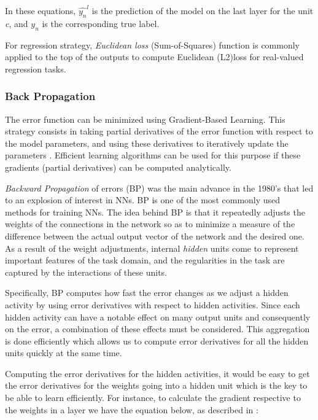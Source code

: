 In these equations, $\hat{y_n}^{l}$ is the prediction of the model on the last layer for the unit \textit{c}, and $y_n$  is the corresponding true label.

For regression strategy, \textit{Euclidean loss} (Sum-of-Squares) function is commonly applied to the top of the outputs to compute Euclidean (L2)loss for real-valued regression tasks.
 


\subsubsection{Back Propagation}
\label{subsec:bp}

The error function can be minimized using Gradient-Based Learning. This strategy consists in taking partial derivatives of the error function with respect to the model parameters, and using these derivatives to iteratively update the parameters \cite{lecun1998gradient}. Efficient learning algorithms can be used for this purpose if these gradients (partial derivatives) can be computed analytically.

\textit{Backward Propagation} of errors (BP) was the main advance in the 1980's that led to an explosion of interest in NNs. BP is one of the most commonly used methods for training NNs. The idea behind BP is that it repeatedly adjusts the weights of the connections in the network so as to minimize a measure of the difference between the actual output vector of the network and the desired one. As a result of the weight adjustments, internal \textit{hidden} units come to represent important features of the task domain, and the regularities in the task are captured by the interactions of these units\cite{williams1986learning}.

Specifically, BP computes how fast the error changes as we adjust a hidden activity by using error derivatives with respect to hidden activities. Since each hidden activity can have a notable effect on many output units and consequently on the error, a combination of these effects must be considered. This aggregation is done efficiently which allows us to compute error derivatives for all the hidden units quickly at the same time. 

\indent Computing the error derivatives for the hidden activities, it would be easy to get the error derivatives for the weights going into a hidden unit which is the key to be able to learn efficiently. For instance, to calculate the gradient respective to the weights in a layer we have the
equation below, as described in \cite{alpaydin2014introduction}:

